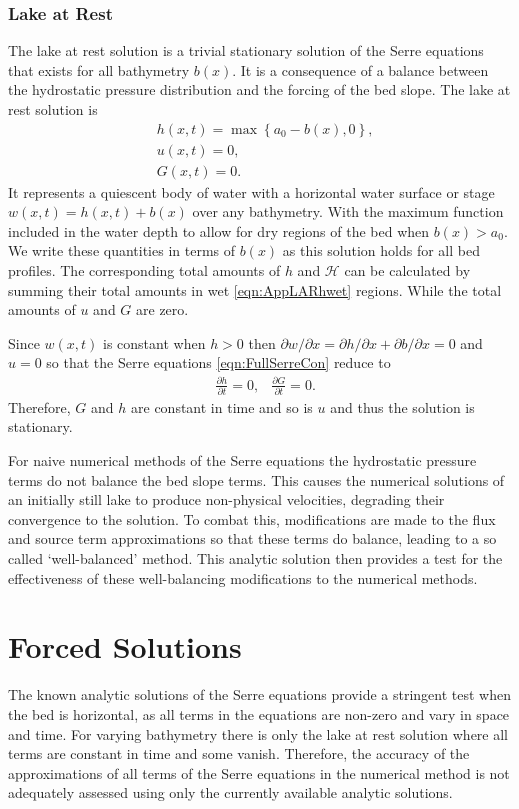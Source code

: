 \subsubsection{Lake at Rest}
The lake at rest solution is a trivial stationary solution of the Serre equations that exists for all bathymetry $b(x)$. It is a consequence of a balance between the hydrostatic pressure distribution and the forcing of the bed slope. The lake at rest solution is
\begin{subequations}
	\begin{align}
	&h(x,t) = \max\left\lbrace a_0 - b(x), 0 \right\rbrace, \\
	&u(x,t) = 0 , \\
	&G(x,t) = 0 .
	\end{align}
	\label{eqn:LARdefhub}
\end{subequations}
It represents a quiescent body of water with a horizontal water surface or stage $w(x,t) = h(x,t) + b(x)$ over any bathymetry. With the maximum function included in the water depth to allow for dry regions of the bed when $b(x) > a_0$. We write these quantities in terms of $b(x)$ as this solution holds for all bed profiles. The corresponding total amounts of $h$ and $\mathcal{H}$ can be calculated by summing their total amounts in wet \eqref{eqn:AppLARhwet} regions. While the total amounts of $u$ and $G$ are zero. 

Since $w(x,t)$ is constant when $h> 0$ then $\partial w / \partial x = \partial h / \partial x + \partial b / \partial x = 0 $ and $u=0$ so that the Serre equations \eqref{eqn:FullSerreCon} reduce to
\begin{align*}
& \frac{\partial h}{\partial t}  = 0,  &\frac{\partial G}{\partial t}  = 0.
\end{align*}
Therefore, $G$ and $h$ are constant in time and so is $u$ and thus the solution is stationary.

For naive numerical methods of the Serre equations the hydrostatic pressure terms do not balance the bed slope terms. This causes the numerical solutions of an initially still lake to produce non-physical velocities, degrading their convergence to the solution. To combat this, modifications are made to the flux and source term approximations so that these terms do balance, leading to a so called `well-balanced' method. This analytic solution then provides a test for the effectiveness of these well-balancing modifications to the numerical methods.


\section{Forced Solutions}
The known analytic solutions of the Serre equations provide a stringent test when the bed is horizontal, as all terms in the equations are non-zero and vary in space and time. For varying bathymetry there is only the lake at rest solution where all terms are constant in time and some vanish. Therefore, the accuracy of the approximations of all terms of the Serre equations in the numerical method is not adequately assessed using only the currently available analytic solutions.

